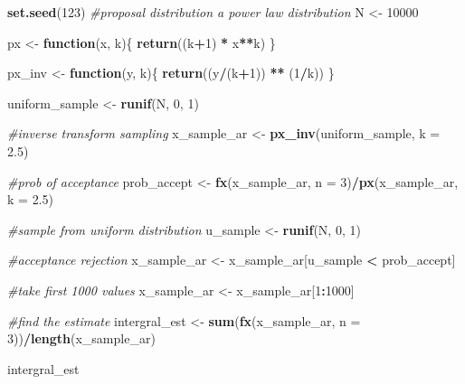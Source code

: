 \documentclass[
]{article}
\newenvironment{Shaded}{\begin{snugshade}}{\end{snugshade}}
\newcommand{\AttributeTok}[1]{\textcolor[rgb]{0.13,0.29,0.53}{#1}}
\newcommand{\CommentTok}[1]{\textcolor[rgb]{0.56,0.35,0.01}{\textit{#1}}}
\newcommand{\ControlFlowTok}[1]{\textcolor[rgb]{0.13,0.29,0.53}{\textbf{#1}}}
\newcommand{\DecValTok}[1]{\textcolor[rgb]{0.00,0.00,0.81}{#1}}
\newcommand{\FloatTok}[1]{\textcolor[rgb]{0.00,0.00,0.81}{#1}}
\newcommand{\FunctionTok}[1]{\textcolor[rgb]{0.13,0.29,0.53}{\textbf{#1}}}
\newcommand{\NormalTok}[1]{#1}
\newcommand{\OtherTok}[1]{\textcolor[rgb]{0.56,0.35,0.01}{#1}}
\newcommand{\SpecialCharTok}[1]{\textcolor[rgb]{0.81,0.36,0.00}{\textbf{#1}}}
\begin{document}
\begin{Shaded}
\begin{Highlighting}[]
\FunctionTok{set.seed}\NormalTok{(}\DecValTok{123}\NormalTok{)}
\CommentTok{\#proposal distribution a power law distribution}
\NormalTok{N }\OtherTok{\textless{}{-}} \DecValTok{10000}

\NormalTok{px }\OtherTok{\textless{}{-}} \ControlFlowTok{function}\NormalTok{(x, k)\{}
  \FunctionTok{return}\NormalTok{((k}\SpecialCharTok{+}\DecValTok{1}\NormalTok{) }\SpecialCharTok{*}\NormalTok{ x}\SpecialCharTok{**}\NormalTok{k)}
\NormalTok{\}}


\NormalTok{px\_inv }\OtherTok{\textless{}{-}} \ControlFlowTok{function}\NormalTok{(y, k)\{}
  \FunctionTok{return}\NormalTok{((y}\SpecialCharTok{/}\NormalTok{(k}\SpecialCharTok{+}\DecValTok{1}\NormalTok{)) }\SpecialCharTok{**}\NormalTok{ (}\DecValTok{1}\SpecialCharTok{/}\NormalTok{k))}
\NormalTok{\}}

\NormalTok{uniform\_sample }\OtherTok{\textless{}{-}} \FunctionTok{runif}\NormalTok{(N, }\DecValTok{0}\NormalTok{, }\DecValTok{1}\NormalTok{)}

\CommentTok{\#inverse transform sampling}
\NormalTok{x\_sample\_ar }\OtherTok{\textless{}{-}} \FunctionTok{px\_inv}\NormalTok{(uniform\_sample, }\AttributeTok{k =} \FloatTok{2.5}\NormalTok{)}

\CommentTok{\#prob of acceptance}
\NormalTok{prob\_accept }\OtherTok{\textless{}{-}} \FunctionTok{fx}\NormalTok{(x\_sample\_ar, }\AttributeTok{n =} \DecValTok{3}\NormalTok{)}\SpecialCharTok{/}\FunctionTok{px}\NormalTok{(x\_sample\_ar, }\AttributeTok{k =} \FloatTok{2.5}\NormalTok{)}

\CommentTok{\#sample from uniform distribution}
\NormalTok{u\_sample }\OtherTok{\textless{}{-}} \FunctionTok{runif}\NormalTok{(N, }\DecValTok{0}\NormalTok{, }\DecValTok{1}\NormalTok{)}

\CommentTok{\#acceptance rejection}
\NormalTok{x\_sample\_ar }\OtherTok{\textless{}{-}}\NormalTok{ x\_sample\_ar[u\_sample }\SpecialCharTok{\textless{}}\NormalTok{ prob\_accept]}

\CommentTok{\#take first 1000 values}
\NormalTok{x\_sample\_ar }\OtherTok{\textless{}{-}}\NormalTok{ x\_sample\_ar[}\DecValTok{1}\SpecialCharTok{:}\DecValTok{1000}\NormalTok{]}

\CommentTok{\#find the estimate}
\NormalTok{intergral\_est }\OtherTok{\textless{}{-}} \FunctionTok{sum}\NormalTok{(}\FunctionTok{fx}\NormalTok{(x\_sample\_ar, }\AttributeTok{n =} \DecValTok{3}\NormalTok{))}\SpecialCharTok{/}\FunctionTok{length}\NormalTok{(x\_sample\_ar)}

\NormalTok{intergral\_est}
\end{Highlighting}
\end{Shaded}
\end{document}
